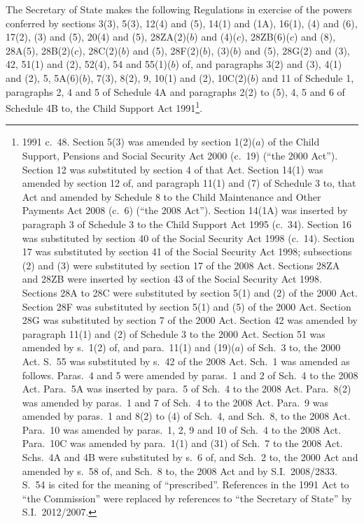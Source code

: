 \documentclass[12pt,a4paper]{article}
\title{\regstitle}
\author{S.I.\ 2012 No.\ 2677}
\date{Made
20th October 2012\\
Coming into force
in accordance with regulation 1
}
\begin{document}
\maketitle

\enlargethispage{\baselineskip}

\noindent
The Secretary of State makes the following Regulations in exercise of the powers conferred by sections 3(3), 5(3), 12(4) and (5), 14(1) and (1A), 16(1), (4) and (6), 17(2), (3) and (5), 20(4) and (5), 28ZA(2)($b$)  and (4)($c$), 28ZB(6)($c$)  and (8), 28A(5), 28B(2)($c$), 28C(2)($b$)  and (5), 28F(2)($b$), (3)($b$)  and (5), 28G(2) and (3), 42, 51(1) and (2), 52(4), 54 and 55(1)($b$)  of, and paragraphs 3(2) and (3), 4(1) and (2), 5, 5A(6)($b$), 7(3), 8(2), 9, 10(1) and (2), 10C(2)($b$)  and 11 of Schedule 1, paragraphs 2, 4 and 5 of Schedule 4A and paragraphs 2(2) to (5), 4, 5 and 6 of Schedule 4B to, the Child Support Act 1991\footnote{1991 c.~48. Section 5(3) was amended by section 1(2)($a$)  of the Child Support, Pensions and Social Security Act 2000 (c.~19) (“the 2000 Act”). Section 12 was substituted by section 4 of that Act. Section 14(1) was amended by section 12 of, and paragraph 11(1) and (7) of Schedule 3 to, that Act and amended by Schedule 8 to the Child Maintenance and Other Payments Act 2008 (c.~6) (“the 2008 Act”). Section 14(1A) was inserted by paragraph 3 of Schedule 3 to the Child Support Act 1995 (c.~34). Section 16 was substituted by section 40 of the Social Security Act 1998 (c.~14). Section 17 was substituted by section 41 of the Social Security Act 1998; subsections (2) and (3) were substituted by section 17 of the 2008 Act. Sections 28ZA and 28ZB were inserted by section 43 of the Social Security Act 1998. Sections 28A to 28C were substituted by section 5(1) and (2) of the 2000 Act. Section 28F was substituted by section 5(1) and (5) of the 2000 Act. Section 28G was substituted by section 7 of the 2000 Act. Section 42 was amended by paragraph 11(1) and (2) of Schedule 3 to the 2000 Act. Section 51 was amended by s.\ 1(2) of, and para.\ 11(1) and (19)($a$)  of Sch.\ 3 to, the 2000 Act. S.\ 55 was substituted by s.\ 42 of the 2008 Act. Sch.\ 1 was amended as follows. Paras.\ 4 and 5 were amended by paras.\ 1 and 2 of Sch.\ 4 to the 2008 Act. Para.\ 5A was inserted by para.\ 5 of Sch.\ 4 to the 2008 Act. Para.\ 8(2) was amended by paras.\ 1 and 7 of Sch.\ 4 to the 2008 Act. Para.\ 9 was amended by paras.\ 1 and 8(2) to (4) of Sch.\ 4, and Sch.\ 8, to the 2008 Act. Para.\ 10 was amended by paras.\ 1, 2, 9 and 10 of Sch.\ 4 to the 2008 Act. Para.\ 10C was amended by para.\ 1(1) and (31) of Sch.\ 7 to the 2008 Act. Schs.\ 4A and 4B were substituted by s.\ 6 of, and Sch.\ 2 to, the 2000 Act and amended by s.\ 58 of, and Sch.\ 8 to, the 2008 Act and by S.I.~2008/2833. S.\ 54 is cited for the meaning of “prescribed”. References in the 1991 Act to “the Commission” were replaced by references to “the Secretary of State” by S.I.~2012/2007.}.
\end{document}
